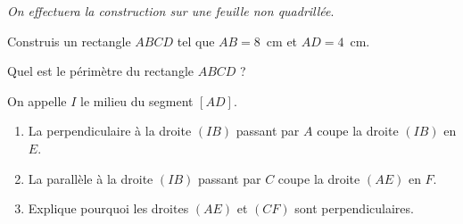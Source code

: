 {\em On effectuera la construction sur une feuille non quadrillée}.
\begin{myenumerate}
  \item Construis un rectangle $ABCD$ tel que $AB=8$~cm et $AD=4$~cm.
  \item Quel est le périmètre du rectangle $ABCD$ ?
  \item On appelle $I$ le milieu du segment $[AD]$.
    \begin{enumerate}
    \item La perpendiculaire à la droite $(IB)$ passant par $A$ coupe
      la droite $(IB)$ en $E$.
    \item La parallèle à la droite $(IB)$ passant par $C$ coupe la
      droite $(AE)$ en $F$.
    \item Explique pourquoi les droites $(AE)$ et $(CF)$ sont perpendiculaires.
    \end{enumerate}
\end{myenumerate}